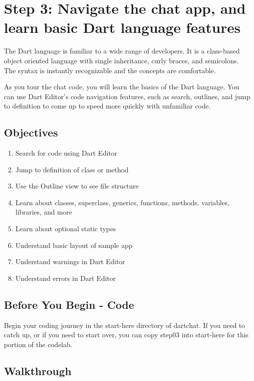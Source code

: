 \section{Step 3: Navigate the chat app, and learn basic Dart language features}

The Dart language is familiar to a wide range of developers. It is a class-based object oriented language with single inheritance, curly braces, and semicolons. The syntax is instantly recognizable and the concepts are comfortable.

As you tour the chat code, you will learn the basics of the Dart language. You can use Dart Editor’s code navigation features, such as search, outlines, and jump to definition to come up to speed more quickly with unfamiliar code.

\subsection{Objectives}

\begin{enumerate}
\item Search for code using Dart Editor
\item Jump to definition of class or method
\item Use the Outline view to see file structure
\item Learn about classes, superclass, generics, functions, methods, variables, libraries, and more
\item Learn about optional static types
\item Understand basic layout of sample app
\item Understand warnings in Dart Editor
\item Understand errors in Dart Editor
\end{enumerate}

\subsection{Before You Begin - Code}

Begin your coding journey in the start-here directory of dartchat. If you need to catch up, or if you need to start over, you can copy step03 into start-here for this portion of the codelab.

\subsection{Walkthrough}

